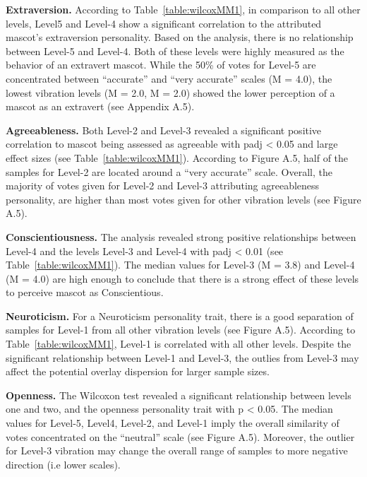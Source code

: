 \par \textbf{Extraversion.} According to Table~\ref{table:wilcoxMM1}, in comparison to all other levels, Level5 and Level-4 show a significant correlation to the attributed mascot’s extraversion personality. Based on the analysis, there is no relationship between Level-5 and Level-4. Both of these levels were highly measured as the behavior of an extravert mascot. While the 50\% of votes for Level-5 are concentrated between “accurate” and “very accurate” scales (M = 4.0), the lowest vibration levels (M = 2.0, M = 2.0) showed the lower perception of a mascot as an extravert (see Appendix A.5).
\par \textbf{Agreeableness.} Both Level-2 and Level-3 revealed a significant positive correlation to mascot being assessed as agreeable with padj < 0.05 and large effect sizes (see Table~\ref{table:wilcoxMM1}). According to Figure A.5, half of the samples for Level-2 are located around a “very accurate” scale. Overall, the majority of votes given for Level-2 and Level-3 attributing agreeableness personality, are higher than most votes given for other vibration levels (see Figure A.5).
\par \textbf{Conscientiousness.} The analysis revealed strong positive relationships between Level-4 and the levels Level-3 and Level-4 with padj < 0.01 (see Table~\ref{table:wilcoxMM1}). The median values for Level-3 (M = 3.8) and Level-4 (M = 4.0) are high enough to conclude that there is a strong effect of these levels to perceive mascot as Conscientious.
\par \textbf{Neuroticism.} For a Neuroticism personality trait, there is a good separation of samples for Level-1 from all other vibration levels (see Figure A.5). According to Table~\ref{table:wilcoxMM1}, Level-1 is correlated with all other levels. Despite the significant relationship between Level-1 and Level-3, the outlies from Level-3 may affect the potential overlay dispersion for larger sample sizes.
\par \textbf{Openness.} The Wilcoxon test revealed a significant relationship between levels one and two, and the openness personality trait with p < 0.05. The median values for Level-5, Level4, Level-2, and Level-1 imply the overall similarity of votes concentrated on the “neutral” scale (see Figure A.5). Moreover, the outlier for Level-3 vibration may change the overall range of samples to more negative direction (i.e lower scales).


